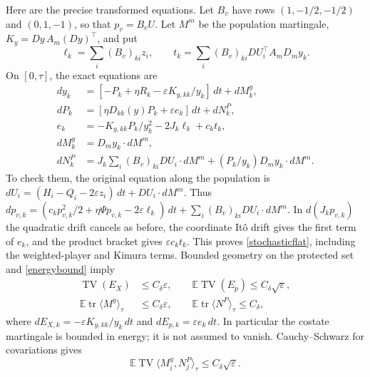 \documentclass[11pt,a4paper]{article}
\newcommand{\E}{\mathbb E}
\newcommand{\tr}{\operatorname{tr}}
\newcommand{\TV}{\operatorname{TV}}
\newcommand{\dt}{\,dt}
\begin{document}
Here are the precise transformed equations. Let $B_v$ have rows
$(1,-1/2,-1/2)$ and $(0,1,-1)$, so that $p_v=B_vU$.
Let $M^m$ be the population martingale,
$K_y=Dy\,A_m(Dy)^\top$, and put
\[
 \ell_k=\sum_i(B_v)_{ki}z_i,\qquad
 t_k=\sum_i(B_v)_{ki}DU_i^\top A_mD_my_k.
\]
On $[0,\tau]$, the exact equations are
\begin{equation}\label{stochasticflat}
 \begin{split}
 dy_k&=[-P_k+\eta R_k-\varepsilon K_{y,kk}/y_k]\dt+dM_k^y,\\
 dP_k&=[\eta D_{kk}(y)P_k+\varepsilon e_k]\dt+dN_k^P,\\
 e_k&=-K_{y,kk}P_k/y_k^2-2J_k\ell_k+c_kt_k,\\
 dM_k^y&=D_my_k\cdot dM^m,\\
 dN_k^P&=J_k\sum_i(B_v)_{ki}DU_i\cdot dM^m
                    +(P_k/y_k)D_my_k\cdot dM^m.
 \end{split}
\end{equation}
To check them, the original equation along the population is
$dU_i=(H_i-Q_i-2\varepsilon z_i)\dt+DU_i\cdot dM^m$.
Thus
$dp_{v,k}=(c_kp_{v,k}^2/2+\eta\Psi p_{v,k}
-2\varepsilon\ell_k)\dt+\sum_i(B_v)_{ki}DU_i\cdot dM^m$.
In $d(J_kp_{v,k})$ the quadratic drift cancels as before, the
coordinate It\^o drift gives the first term of $e_k$, and the product
bracket gives $\varepsilon c_kt_k$. This proves
\eqref{stochasticflat}, including the weighted-player and Kimura terms.
Bounded geometry on the protected set and \eqref{energybound} imply
\begin{equation}\label{noisebounds}
 \begin{split}
 \TV(E_X)&\leq C_\delta\varepsilon,\qquad
 \E\TV(E_p)\leq C_\delta\sqrt\varepsilon,\\
 \E\tr\langle M^y\rangle_\tau&\leq C_\delta\varepsilon,\qquad
 \E\tr\langle N^P\rangle_\tau\leq C_\delta,
 \end{split}
\end{equation}
where $dE_{X,k}=-\varepsilon K_{y,kk}/y_k\dt$ and
$dE_{p,k}=\varepsilon e_k\dt$.
In particular the costate martingale is bounded in energy; it is not
assumed to vanish. Cauchy--Schwarz for covariations gives
\begin{equation}\label{crossnoise}
 \E\TV\langle M_i^y,N_j^P\rangle_\tau
       \leq C_\delta\sqrt\varepsilon.
\end{equation}
\end{document}

